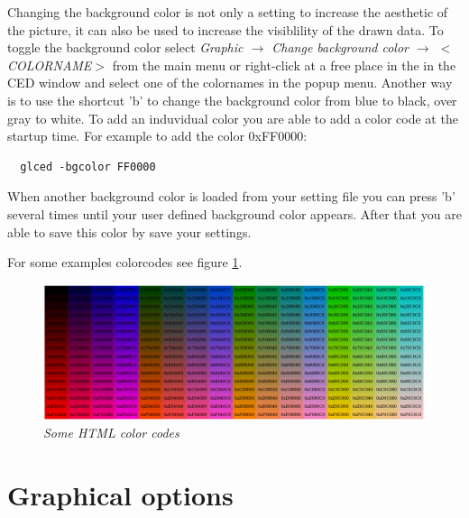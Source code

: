\documentclass[a4paper,10pt]{article}
\begin{document}
Changing the background color is not only a setting to increase the aesthetic of the picture, it can also be used to increase the visiblility of the drawn data.
To toggle the background color select \textit{Graphic $\to$ Change background color $\to$ $<$COLORNAME$>$} from the main menu or right-click at a free place in the in the CED window and select one of the colornames in the popup menu.  
Another way is to use the shortcut 'b' to change the background color from blue to black, over gray to white.
To add an induvidual color you are able to add a color code at the startup time. 
For example to add the color 0xFF0000: 
\begin{verbatim}
  glced -bgcolor FF0000 
\end{verbatim}
When another background color is loaded from your setting file you can press 'b' several times until your user defined background color appears. 
After that you are able to save this color by save your settings. 



%

For some examples colorcodes see figure \ref{html}.
\begin{figure}
\setlength{\fboxsep}{0mm}
\centerline{\includegraphics[width=1\linewidth]{img/html_colors.png}}
\caption{\label{html}\textsl{Some HTML color codes}}
\end{figure}

\section{Graphical options}
\end{document}
